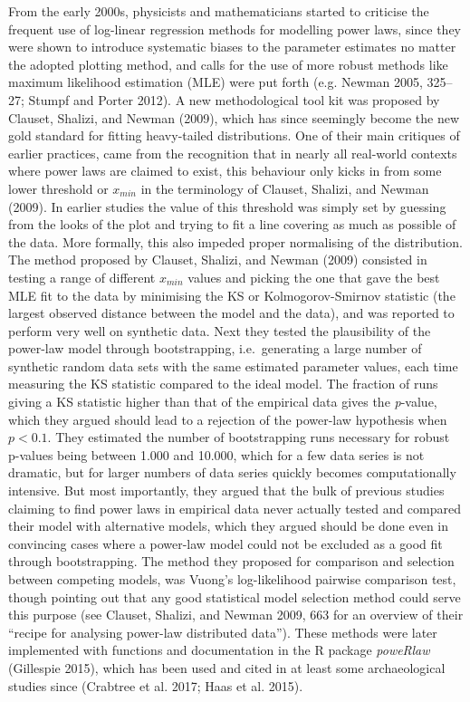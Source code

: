 \documentclass[
  12pt,
  a4paper, twoside]{book}
\begin{document}
From the early 2000s, physicists and mathematicians started to criticise the frequent use of log-linear regression methods for modelling power laws, since they were shown to introduce systematic biases to the parameter estimates no matter the adopted plotting method, and calls for the use of more robust methods like maximum likelihood estimation (MLE) were put forth (e.g. Newman 2005, 325--27; Stumpf and Porter 2012). A new methodological tool kit was proposed by Clauset, Shalizi, and Newman (2009), which has since seemingly become the new gold standard for fitting heavy-tailed distributions. One of their main critiques of earlier practices, came from the recognition that in nearly all real-world contexts where power laws are claimed to exist, this behaviour only kicks in from some lower threshold or \(x_{min}\) in the terminology of Clauset, Shalizi, and Newman (2009). In earlier studies the value of this threshold was simply set by guessing from the looks of the plot and trying to fit a line covering as much as possible of the data. More formally, this also impeded proper normalising of the distribution. The method proposed by Clauset, Shalizi, and Newman (2009) consisted in testing a range of different \(x_{min}\) values and picking the one that gave the best MLE fit to the data by minimising the KS or Kolmogorov-Smirnov statistic (the largest observed distance between the model and the data), and was reported to perform very well on synthetic data. Next they tested the plausibility of the power-law model through bootstrapping, i.e.~generating a large number of synthetic random data sets with the same estimated parameter values, each time measuring the KS statistic compared to the ideal model. The fraction of runs giving a KS statistic higher than that of the empirical data gives the \emph{p}-value, which they argued should lead to a rejection of the power-law hypothesis when \(p < 0.1\). They estimated the number of bootstrapping runs necessary for robust p-values being between 1.000 and 10.000, which for a few data series is not dramatic, but for larger numbers of data series quickly becomes computationally intensive. But most importantly, they argued that the bulk of previous studies claiming to find power laws in empirical data never actually tested and compared their model with alternative models, which they argued should be done even in convincing cases where a power-law model could not be excluded as a good fit through bootstrapping. The method they proposed for comparison and selection between competing models, was Vuong's log-likelihood pairwise comparison test, though pointing out that any good statistical model selection method could serve this purpose (see Clauset, Shalizi, and Newman 2009, 663 for an overview of their ``recipe for analysing power-law distributed data''). These methods were later implemented with functions and documentation in the R package \emph{poweRlaw} (Gillespie 2015), which has been used and cited in at least some archaeological studies since (Crabtree et al. 2017; Haas et al. 2015).
\end{document}
